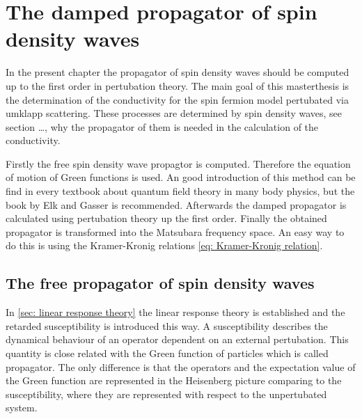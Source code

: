 %
%
%
\chapter{The damped propagator of spin density waves}
\label{ch: propagator}
%
%
%
In the present chapter the propagator of spin density waves should be computed up to the first order in pertubation theory.
The main goal of this masterthesis is the determination of the conductivity for the spin fermion model pertubated via umklapp scattering.
These processes are determined by spin density waves, see section \dots {}, why the propagator of them is needed in the calculation of the conductivity.

Firstly the free spin density wave propagtor is computed.
Therefore the equation of motion of Green functions is used. 
An good introduction of this method can be find in every textbook about quantum field theory in many body physics, but the book by Elk and Gasser \cite{Elk&Gasser} is recommended.
Afterwards the damped propagator is calculated using pertubation theory up the first order.
Finally the obtained propagator is transformed into the Matsubara frequency space.
An easy way to do this is using the Kramer-Kronig relations \eqref{eq: Kramer-Kronig relation}.
%
%
\section{The free propagator of spin density waves}
\label{sec: free propagator}
%
%
In \ref{sec: linear response theory} the linear response theory is established and the retarded susceptibility is introduced this way.
A susceptibility describes the dynamical behaviour of an operator dependent on an external pertubation.
This quantity is close related with the Green function of particles which is called propagator.
The only difference is that the operators and the expectation value of the Green function are represented in the Heisenberg picture comparing to the susceptibility, where they are represented with respect to the unpertubated system.

